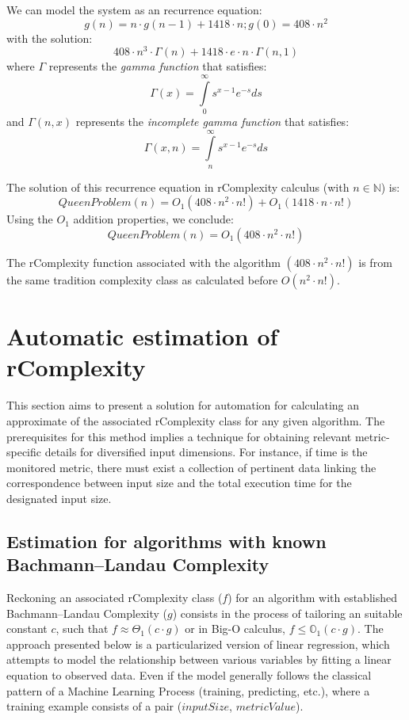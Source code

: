 We can model the system as an recurrence equation:
\[ g(n) = n \cdot  g(n-1) + 1418 \cdot  n; g(0) = 408 \cdot  n^{2} \]
with the solution:
\[ 408 \cdot n^{3} \cdot \Gamma(n) + 1418 \cdot e \cdot  n \cdot \Gamma(n, 1)\]
where $\Gamma$ represents the \textit{gamma function} that satisfies: \[ \Gamma \left( x \right) = \int\limits_0^\infty {s^{x - 1} e^{ - s} ds} \] and $ \Gamma(n,x)$ represents the \textit{incomplete gamma function} that satisfies: \[ \Gamma \left(x, n \right) = \int\limits_n^\infty {s^{x - 1} e^{ - s} ds}\]

The solution of this recurrence equation in rComplexity calculus (with $n \in \mathbb{N}$) is:
\[ QueenProblem(n) = O_{1}(408 \cdot n^{2} \cdot n!) +  O_{1}(1418 \cdot n \cdot n!) \]
Using the $O_{1}$ addition properties, we conclude:
\[ QueenProblem(n) = O_{1}(408 \cdot n^{2} \cdot n!) \]

\begin{remark}
The rComplexity function associated with the algorithm $(408 \cdot n^{2} \cdot n!)$ is from the same tradition complexity class as calculated before $ O(n^2\cdot n!)$.
\end{remark}


\section{Automatic estimation of rComplexity}
This section aims to present a solution for automation for calculating an approximate of the associated rComplexity class for any given algorithm. The prerequisites for this method implies a technique for obtaining relevant metric-specific details for diversified input dimensions. For instance, if time is the monitored metric, there must exist a collection of pertinent data linking the correspondence between input size and the total execution time for the designated input size.

\subsection{Estimation for algorithms with known Bachmann–Landau Complexity}
Reckoning an associated rComplexity class ($f$) for an algorithm with established Bachmann–Landau Complexity ($g$) consists in the process of tailoring an suitable constant $c$, such that $f \approx \Theta_{1}(c \cdot g)$ or in Big-O calculus, $f \leq  \mathbb{O}_{1} (c \cdot g)$. The approach presented below is a particularized version of linear regression, which attempts to model the relationship between various variables by fitting a linear equation to observed data. Even if the model generally follows the classical pattern of a Machine Learning Process (training, predicting, etc.), where a training example consists of a pair ($inputSize$, $metricValue$).

